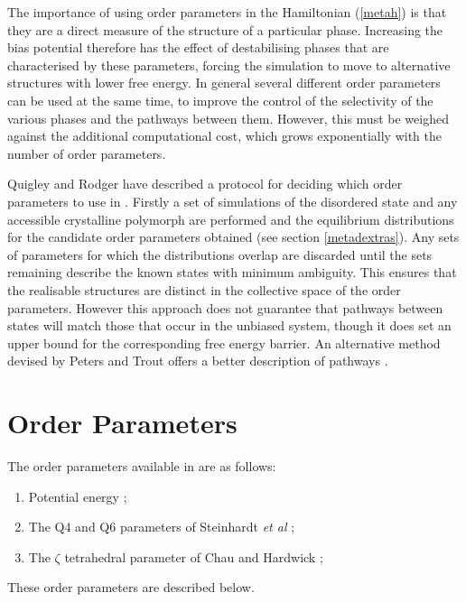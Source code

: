 The importance of using order parameters in the Hamiltonian (\ref{metah}) is
that they are a direct measure of the structure of a particular phase.
Increasing the bias potential therefore has the effect of destabilising phases
that are characterised by these parameters, forcing the simulation to move to
alternative structures with lower free energy. In general several different
order parameters can be used at the same time, to improve the control of the
selectivity of the various phases and the pathways between them. However, this
must be weighed against the additional computational cost, which grows
exponentially with the number of order parameters.

Quigley and Rodger have described a protocol for deciding which order
parameters to use in \cite{quigley-09a}. Firstly a set of simulations of the
disordered state and any accessible crystalline polymorph are performed and
the equilibrium distributions for the candidate order parameters obtained (see
section \ref{metadextras}). Any sets of parameters for which the distributions
overlap are discarded until the sets remaining describe the known states with
minimum ambiguity. This ensures that the realisable structures are distinct in
the collective space of the order parameters. However this approach does not
guarantee that pathways between states will match those that occur in the
unbiased system, though it does set an upper bound for the corresponding free
energy barrier. An alternative method devised by Peters and Trout
offers a better description of pathways \cite{peters-06a}.

\section{Order Parameters}

The order parameters available in \D{} are as follows:
\begin{enumerate}
\item Potential energy \cite{donadio-05a};
\item The Q4 and Q6 parameters of Steinhardt {\em et al} \cite{steinhardt-83a};
\item The $\zeta$ tetrahedral parameter of Chau and Hardwick \cite{chau-98a}; 
\end{enumerate}
These order parameters are described below.

